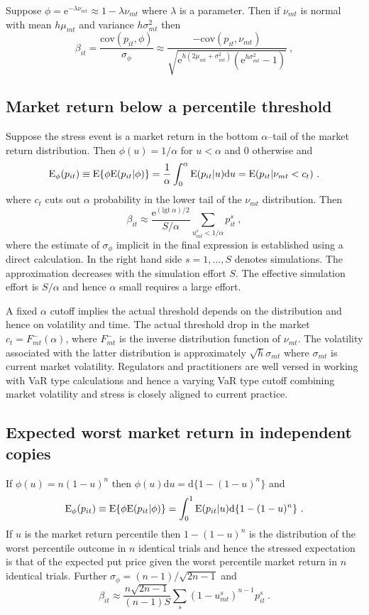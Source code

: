 \documentclass[authoryear]{elsarticle}
\newcommand{\logit}{\mathrm{lgt}}
\newcommand{\E}{\mathrm{E}}
\newcommand{\e}{\mathrm{e}}
\newcommand{\cov}{\mathrm{cov}}
\newcommand{\de}{\mathrm{d}}
\begin{document}
Suppose $\phi=\e^{-\lambda\nu_{mt}}\approx 1-\lambda\nu_{mt}$ where $\lambda$ is a parameter.   Then  if $\nu_{mt}$ is normal with mean $h\mu_{mt}$ and variance $ h\sigma^2_{mt}$ then
$$
\beta_{it} = \frac{\cov(p_{it},\phi)}{\sigma_\phi}  \approx \frac{-\cov(p_{it},\nu_{mt})}{\sqrt{\e^{h(2\mu_{mt}+\sigma_{mt}^2)}\left(\e^{h\sigma_{mt}^2}-1\right)}}\ ,
$$
\subsection{Market return below a percentile threshold} 

Suppose the stress event is a market return in the bottom $\alpha$--tail of the  market return distribution.   Then  $\phi(u)=1/\alpha$ for $u< \alpha$ and 0  otherwise and
$$
\Es(p_{it}) \equiv \E\{\phi\E(p_{it}|\phi)\} = \frac{1}{\alpha}\int_0^\alpha\E(p_{it}|u)\de u = \E(p_{it}|\nu_{mt}<c_{t}) \ .
$$
where $c_t$ cuts out $\alpha$ probability in the lower tail of the $\nu_{mt}$ distribution.   Then
$$
\beta_{it} \approx  \frac{\e^{(\logit\ \alpha)/2}}{S/\alpha} \sum_{u^s_{mt}<1/\alpha}  p_{it}^s\ ,
$$
where the estimate of $\sigma_\phi$ implicit in the final expression is established using a direct calculation.  In the right hand side $s=1,\ldots,S$ denotes simulations.  The approximation decreases with the simulation effort $S$.   The effective simulation effort is $S/\alpha$ and hence $\alpha$ small requires a  large effort.

A fixed $\alpha$ cutoff  implies the actual threshold depends on the distribution and hence  on volatility and  time.  The actual threshold drop in the market $c_t=F_{mt}^-(\alpha)$, where $F_{mt}^-$ is the inverse distribution function of $\nu_{mt}$.  The volatility associated with the latter distribution is approximately $\sqrt{h}\sigma_{mt}$ where $\sigma_{mt}$ is current market volatility.   Regulators and practitioners  are well versed in working with VaR type calculations and hence a varying VaR type cutoff combining market volatility and stress is closely aligned to current practice. 


\subsection{Expected worst market return in independent copies} 
If $\phi(u)=n(1-u)^n$ then $\phi(u)\de u = \de\{1-(1-u)^n\}$ and 
$$
\Es(p_{it}) \equiv \E\{\phi\E(p_{it}|\phi)\} = \int_0^1\E(p_{it}|u)\de\{1-(1-u)^n\}\ .
$$
If $u$ is the market return percentile then  $1-(1-u)^n$ is the distribution of the worst percentile outcome in $n$ identical trials and hence the stressed expectation is that of the expected put price given the worst percentile market return in $n$ identical trials.  Further 
 $\sigma_\phi=(n-1)/\sqrt{2n-1}$ and 
$$
\beta_{it}  \approx \frac{n\sqrt{2n-1}}{(n-1)S} \sum_s (1-u^s_{mt})^{n-1}p_{it}^s \ . 
$$
\end{document}
